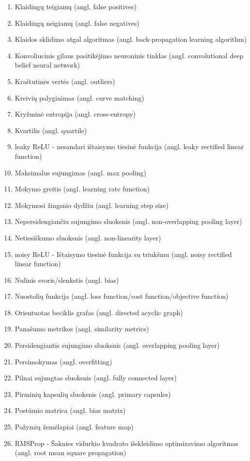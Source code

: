 \begin{enumerate}
	\item Klaidingų teigiamų (angl. false positives)
	\item Klaidingų neigiamų (angl. false negatives)
	\item Klaidos sklidimo atgal algoritmas (angl. back-propagation learning algorithm)
	\item Konvoliucinis gilaus pasitikėjimo neuroninis tinklas (angl. convolutional deep belief neural network)
	\item Kraštutinės vertės (angl. outliers)
	\item Kreivių palyginimas (angl. curve matching)
	\item Kryžminė entropija (angl. cross-entropy)
	\item Kvartilis (angl. quartile)
	\item leaky ReLU - nesandari ištaisymo tiesinė funkcija (angl. leaky rectified linear function)
	\item Maksimalus sujungimas (angl. max pooling)
	\item Mokymo greitis (angl. learning rate function)
	\item Mokymosi žingsnio dydžiu (angl. learning step size)
	\item Nepersidengiančiu sujungimo sluoksnis (angl. non-overlapping pooling layer)
	\item Netiesiškumo sluoksnis (angl. non-linearity layer)
	\item noisy ReLU - Ištaisymo tiesinė funkcija su triukšmu (angl. noisy rectified linear function)
	\item Nulinis svoris/slenkstis (angl. bias)
	\item Nuostolių funkcija (angl. loss function/cost function/objective function)
	\item Orientuotas beciklis grafas (angl. directed acyclic graph)
	\item Panašumo metrikos (angl. similarity metrics)
	\item Persidengiantis sujungimo sluoksnis (angl. overlapping pooling layer)
	\item Persimokymas (angl. overfitting)
	\item Pilnai sujungtas sluoksnis (angl. fully connected layer)
	\item Pirminių kapsulių sluoksnis (angl. primary capsules)
	\item Postūmio matrica (angl. bias matrix)
	\item Požymių žemėlapiai (angl. feature map)
	\item RMSProp - Šaknies vidurkio kvadrato išskleidimo optimizavimo algoritmas (angl. root mean square propagation)

\end{enumerate}
